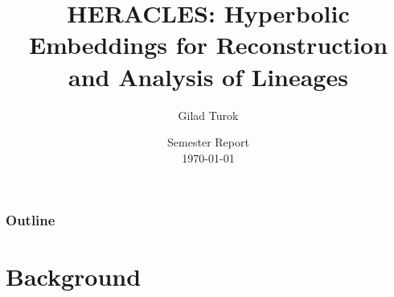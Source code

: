 \documentclass[
	11pt, %
]{beamer}
\title[HERACLES]{HERACLES: Hyperbolic Embeddings for Reconstruction and Analysis of Lineages} %
\author[Gilad Turok]{Gilad Turok} %
\institute[]{Columbia University, Pe'er Lab \\ \smallskip Supervised by Sitara Persad} %
\date[\today]{Semester Report \\ \today} %
\begin{document}

\begin{frame}
	\titlepage %
\end{frame}



\begin{frame}
	\frametitle{Outline} %
	
	\tableofcontents %
\end{frame}


\section{Background}
\end{document}
